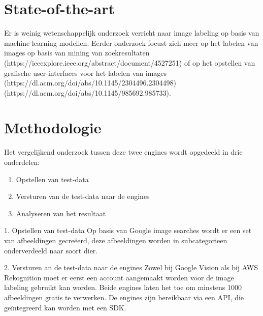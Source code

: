 
\section{State-of-the-art}
\label{sec:state-of-the-art}

Er is weinig wetenschappelijk onderzoek verricht naar image labeling op basis van machine learning modellen. Eerder onderzoek focust zich meer op het labelen van images op basis van mining van zoekresultaten (https://ieeexplore.ieee.org/abstract/document/4527251) of op het opstellen van grafische user-interfaces voor het labelen van images (https://dl.acm.org/doi/abs/10.1145/2304496.2304498) (https://dl.acm.org/doi/abs/10.1145/985692.985733).



\section{Methodologie}
\label{sec:methodologie}

Het vergelijkend onderzoek tussen deze twee engines wordt opgedeeld in drie onderdelen:

\begin{enumerate}
    \item Opstellen van test-data
    \item Versturen van de test-data naar de engines
    \item Analyseren van het resultaat
\end{enumerate}

1. Opstellen van test-data
\linebreak
Op basis van Google image searches wordt er een set van afbeeldingen gecreëerd, deze afbeeldingen worden in subcategorieen onderverdeeld naar soort dier.

2. Versturen an de test-data naar de engines
\linebreak
Zowel bij Google Vision als bij AWS Rekognition moet er eerst een account aangemaakt worden voor de image labeling gebruikt kan worden. Beide engines laten het toe om minstens 1000 afbeeldingen gratis te verwerken. De engines zijn bereikbaar via een API, die geïntegreerd kan worden met een SDK.


